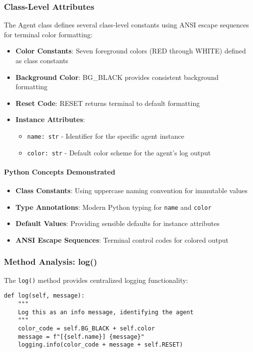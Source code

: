 \subsubsection{Class-Level Attributes}

The Agent class defines several class-level constants using ANSI escape sequences for terminal color formatting:

\begin{itemize}
\item \textbf{Color Constants}: Seven foreground colors (RED through WHITE) defined as class constants
\item \textbf{Background Color}: BG\_BLACK provides consistent background formatting
\item \textbf{Reset Code}: RESET returns terminal to default formatting
\item \textbf{Instance Attributes}: 
  \begin{itemize}
  \item \texttt{name: str} - Identifier for the specific agent instance
  \item \texttt{color: str} - Default color scheme for the agent's log output
  \end{itemize}
\end{itemize}

\paragraph{Python Concepts Demonstrated}
\begin{itemize}
\item \textbf{Class Constants}: Using uppercase naming convention for immutable values
\item \textbf{Type Annotations}: Modern Python typing for \texttt{name} and \texttt{color}
\item \textbf{Default Values}: Providing sensible defaults for instance attributes
\item \textbf{ANSI Escape Sequences}: Terminal control codes for colored output
\end{itemize}

\subsubsection{Method Analysis: log()}

The \texttt{log()} method provides centralized logging functionality:

\begin{lstlisting}[caption=Detailed log() Method Analysis]
def log(self, message):
    """
    Log this as an info message, identifying the agent
    """
    color_code = self.BG_BLACK + self.color
    message = f"[{self.name}] {message}"
    logging.info(color_code + message + self.RESET)
\end{lstlisting}

